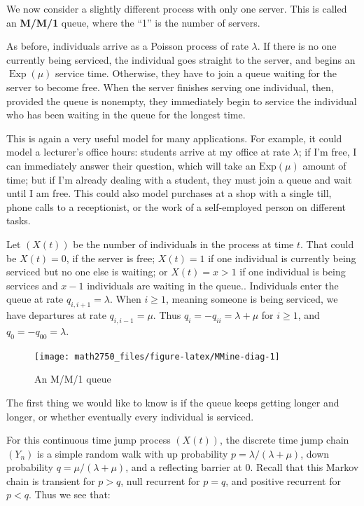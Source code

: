 \documentclass[
  a4paper,
]{article}
\theoremstyle{definition}
\theoremstyle{definition}
\theoremstyle{definition}
\theoremstyle{remark}
\begin{document}
We now consider a slightly different process with only one server. This is called an \textbf{M/M/1} queue, where the ``1'' is the number of servers.

As before, individuals arrive as a Poisson process of rate \(\lambda\). If there is no one currently being serviced, the individual goes straight to the server, and begins an \(\operatorname{Exp}(\mu)\) service time. Otherwise, they have to join a queue waiting for the server to become free. When the server finishes serving one individual, then, provided the queue is nonempty, they immediately begin to service the individual who has been waiting in the queue for the longest time.

This is again a very useful model for many applications. For example, it could model a lecturer's office hours: students arrive at my office at rate \(\lambda\); if I'm free, I can immediately answer their question, which will take an \(\text{Exp}(\mu)\) amount of time; but if I'm already dealing with a student, they must join a queue and wait until I am free. This could also model purchases at a shop with a single till, phone calls to a receptionist, or the work of a self-employed person on different tasks.

Let \((X(t))\) be the number of individuals in the process at time \(t\). That could be \(X(t) = 0\), if the server is free; \(X(t) = 1\) if one individual is currently being serviced but no one else is waiting; or \(X(t) = x > 1\) if one individual is being services and \(x - 1\) individuals are waiting in the queue.. Individuals enter the queue at rate \(q_{i,i+1} = \lambda\). When \(i \geq 1\), meaning someone is being serviced, we have departures at rate \(q_{i,i-1} = \mu\). Thus \(q_i = -q_{ii} = \lambda + \mu\) for \(i \geq 1\), and \(q_0 = -q_{00} = \lambda\).

\begin{figure}

{\centering \texttt{[image: math2750\_files/figure-latex/MMine-diag-1]} 

}

\caption{An M/M/1 queue}\label{fig:MMine-diag}
\end{figure}

The first thing we would like to know is if the queue keeps getting longer and longer, or whether eventually every individual is serviced.

For this continuous time jump process \((X(t))\), the discrete time jump chain \((Y_n)\) is a simple random walk with up probability \(p = \lambda/(\lambda + \mu)\), down probability \(q = \mu/(\lambda + \mu)\), and a reflecting barrier at 0. Recall that this Markov chain is transient for \(p > q\), null recurrent for \(p = q\), and positive recurrent for \(p < q\). Thus we see that:
\end{document}
